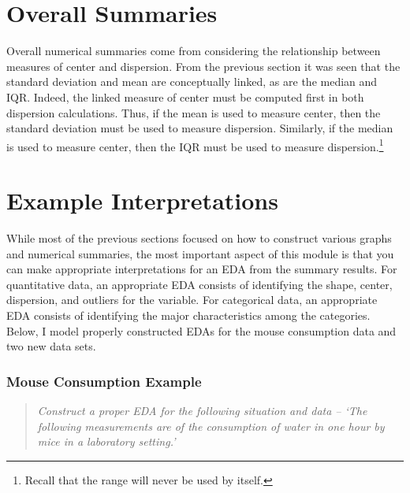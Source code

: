\section{Overall Summaries}
Overall numerical summaries come from considering the relationship between measures of center and dispersion. From the previous section it was seen that the standard deviation and mean are conceptually linked, as are the median and IQR. Indeed, the linked measure of center must be computed first in both dispersion calculations. Thus, if the mean is used to measure center, then the standard deviation must be used to measure dispersion.  Similarly, if the median is used to measure center, then the IQR must be used to measure dispersion.\footnote{Recall that the range will never be used by itself.}


\section{Example Interpretations}
While most of the previous sections focused on how to construct various graphs and numerical summaries, the most important aspect of this module is that you can make appropriate interpretations for an EDA from the summary results. For quantitative data, an appropriate EDA consists of identifying the shape, center, dispersion, and outliers for the variable. For categorical data, an appropriate EDA consists of identifying the major characteristics among the categories. Below, I model properly constructed EDAs for the mouse consumption data and two new data sets.

\subsubsection{Mouse Consumption Example}
\begin{quote}
\textit{Construct a proper EDA for the following situation and data -- `The  following measurements  are of the consumption of water in one hour by mice in a laboratory setting.'}
\end{quote}
\vspace{-12pt}

\begin{knitrout}
\color{fgcolor}\begin{kframe}


{\ttfamily\noindent\bfseries{}}\end{kframe}
\end{knitrout}













